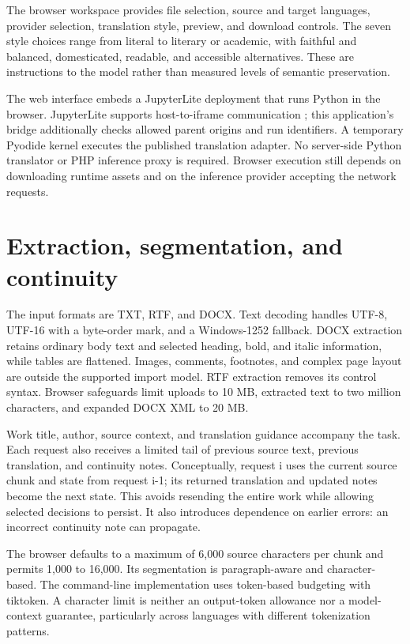 \documentclass[manuscript,screen,nonacm]{acmart}
\begin{document}
The browser workspace provides file selection, source and target languages, provider selection, translation style, preview, and download controls. The seven style choices range from literal to literary or academic, with faithful and balanced, domesticated, readable, and accessible alternatives. These are instructions to the model rather than measured levels of semantic preservation.

The web interface embeds a JupyterLite deployment that runs Python in the browser. JupyterLite supports host-to-iframe communication \cite{jupyter}; this application's bridge additionally checks allowed parent origins and run identifiers. A temporary Pyodide kernel executes the published translation adapter. No server-side Python translator or PHP inference proxy is required. Browser execution still depends on downloading runtime assets and on the inference provider accepting the network requests.

\section{Extraction, segmentation, and continuity}

The input formats are TXT, RTF, and DOCX. Text decoding handles UTF-8, UTF-16 with a byte-order mark, and a Windows-1252 fallback. DOCX extraction retains ordinary body text and selected heading, bold, and italic information, while tables are flattened. Images, comments, footnotes, and complex page layout are outside the supported import model. RTF extraction removes its control syntax. Browser safeguards limit uploads to 10 MB, extracted text to two million characters, and expanded DOCX XML to 20 MB.

Work title, author, source context, and translation guidance accompany the task. Each request also receives a limited tail of previous source text, previous translation, and continuity notes. Conceptually, request i uses the current source chunk and state from request i-1; its returned translation and updated notes become the next state. This avoids resending the entire work while allowing selected decisions to persist. It also introduces dependence on earlier errors: an incorrect continuity note can propagate.

The browser defaults to a maximum of 6,000 source characters per chunk and permits 1,000 to 16,000. Its segmentation is paragraph-aware and character-based. The command-line implementation uses token-based budgeting with tiktoken. A character limit is neither an output-token allowance nor a model-context guarantee, particularly across languages with different tokenization patterns.
\end{document}
